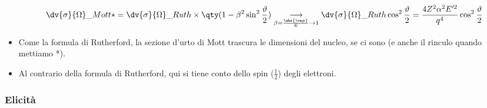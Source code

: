 \begin{itemize}
    \begin{equation*}
    \dv{\sigma}{\Omega}\_{Mott*}=\dv{\sigma}{\Omega}\_{Ruth}\times\qty(1-\beta^2\sin^2\frac\vartheta2)\underset{\beta=\frac{\abs {\va p}}{E}\to1}{\longrightarrow}\dv{\sigma}{\Omega}\_{Ruth}\cos^2\frac\vartheta2=\frac{4Z^2\alpha^2E'^2}{q^4}\cos^2\frac\vartheta2
    \end{equation*}
    \item Come la formula di Rutherford, la sezione d'urto di Mott trascura le dimensioni del nucleo, se ci sono (e anche il rinculo quando mettiamo *).
    \item Al contrario della formula di Rutherford, qui si tiene conto dello spin ($\frac12$) degli elettroni.
\end{itemize}
\subsubsection{Elicità}

